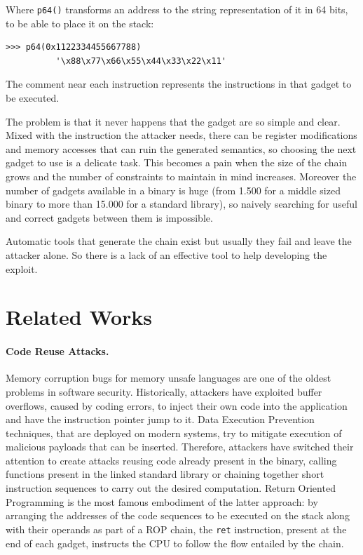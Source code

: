 \documentclass[twocolumn, 11pt]{article}
\begin{document}
\bigskip
Where \texttt{p64()} transforms an address to the string representation of it in 64 bits, to be able to place it on the stack:
\begin{lstlisting}
>>> p64(0x1122334455667788)
          '\x88\x77\x66\x55\x44\x33\x22\x11'
\end{lstlisting}

The comment near each instruction represents the instructions in that gadget to be executed.

\bigskip
The problem is that it never happens that the gadget are so simple and clear. Mixed with the instruction the attacker needs, there can be register modifications and memory accesses that can ruin the generated semantics, so choosing the next gadget to use is a delicate task. This becomes a pain when the size of the chain grows and the number of constraints to maintain in mind increases.
Moreover the number of gadgets available in a binary is huge (from 1.500 for a middle sized binary to more than 15.000 for a standard library), so naively searching for useful and correct gadgets between them is impossible.

 Automatic tools that generate the chain exist but usually they fail and leave the attacker alone. So there is a lack of an effective tool to help developing the exploit.

\section{Related Works}
\label{se:related}
\paragraph{Code Reuse Attacks.}
Memory corruption bugs for memory unsafe languages are one of the oldest problems in software security. Historically, attackers have exploited buffer overflows, caused by coding errors, to inject their own code into the application and have the instruction pointer jump to it. Data Execution Prevention techniques, that are deployed on modern systems, try to mitigate execution of malicious payloads that can be inserted. Therefore, attackers have switched their attention to create attacks reusing code already present in the binary, calling functions present in the linked standard library or chaining together short instruction sequences to carry out the desired computation. Return Oriented Programming is the most famous embodiment of the latter approach: by arranging the addresses of the code sequences to be executed on the stack along with their operands as part of a ROP chain, the {\tt ret} instruction, present at the end of each gadget, instructs the CPU to follow the flow entailed by the chain.
\end{document}
